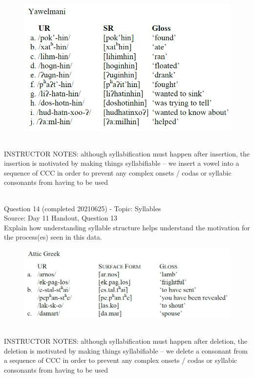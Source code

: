 \documentclass[12pt]{article}
\begin{document}
\begin{figure}[H]
\includegraphics{../images/yawelmani.png}
\end{figure}

~\\
INSTRUCTOR NOTES: although syllabification must happen after insertion, the insertion is motivated by making things syllabifiable -- we insert a vowel into a sequence of CCC in order to prevent any complex onsets / codas or syllabic consonants from having to be used


~\\

{\large Question 14} (completed 20210625) - Topic: Syllables\\
Source: Day 11 Handout, Question 13\\

Explain how understanding syllable structure helps understand the motivation for the process(es) seen in this data.\\

\begin{figure}[H]
\includegraphics{../images/atticgreek.png}
\end{figure}

~\\
INSTRUCTOR NOTES: although syllabification must happen after deletion, the deletion is motivated by making things syllabifiable -- we delete a consonant from a sequence of CCC in order to prevent any complex onsets / codas or syllabic consonants from having to be used
\end{document}
